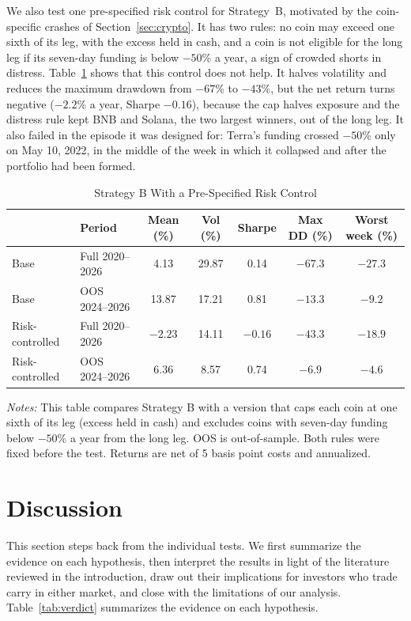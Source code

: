 \documentclass[11pt]{article}
\newcommand{\tabnote}[1]{\par\vspace{0.3em}\begin{minipage}{\linewidth}\footnotesize\setstretch{1.0}\textit{Notes:} #1\end{minipage}}
\begin{document}
We also test one pre-specified risk control for Strategy~B, motivated by the coin-specific crashes of Section~\ref{sec:crypto}. It has two rules: no coin may exceed one sixth of its leg, with the excess held in cash, and a coin is not eligible for the long leg if its seven-day funding is below $-50$\% a year, a sign of crowded shorts in distress. Table~\ref{tab:Crisk} shows that this control does not help. It halves volatility and reduces the maximum drawdown from $-67$\% to $-43$\%, but the net return turns negative ($-2.2$\% a year, Sharpe $-0.16$), because the cap halves exposure and the distress rule kept BNB and Solana, the two largest winners, out of the long leg. It also failed in the episode it was designed for: Terra's funding crossed $-50$\% only on May 10, 2022, in the middle of the week in which it collapsed and after the portfolio had been formed.

\begin{table}[!htbp]
\centering
\caption{Strategy B With a Pre-Specified Risk Control}\label{tab:Crisk}
\small\setlength{\tabcolsep}{4pt}
\begin{tabular}{llccccc}
\toprule
 & Period & Mean (\%) & Vol (\%) & Sharpe & Max DD (\%) & Worst week (\%) \\
\midrule
Base & Full 2020--2026 & 4.13 & 29.87 & 0.14 & $-67.3$ & $-27.3$ \\
Base & OOS 2024--2026 & 13.87 & 17.21 & 0.81 & $-13.3$ & $-9.2$ \\
Risk-controlled & Full 2020--2026 & $-2.23$ & 14.11 & $-0.16$ & $-43.3$ & $-18.9$ \\
Risk-controlled & OOS 2024--2026 & 6.36 & 8.57 & 0.74 & $-6.9$ & $-4.6$ \\
\bottomrule
\end{tabular}
\tabnote{This table compares Strategy B with a version that caps each coin at one sixth of its leg (excess held in cash) and excludes coins with seven-day funding below $-50$\% a year from the long leg. OOS is out-of-sample. Both rules were fixed before the test. Returns are net of 5 basis point costs and annualized.}
\end{table}

\section{Discussion}\label{sec:disc}

This section steps back from the individual tests. We first summarize the evidence on each hypothesis, then interpret the results in light of the literature reviewed in the introduction, draw out their implications for investors who trade carry in either market, and close with the limitations of our analysis. Table~\ref{tab:verdict} summarizes the evidence on each hypothesis.
\end{document}
